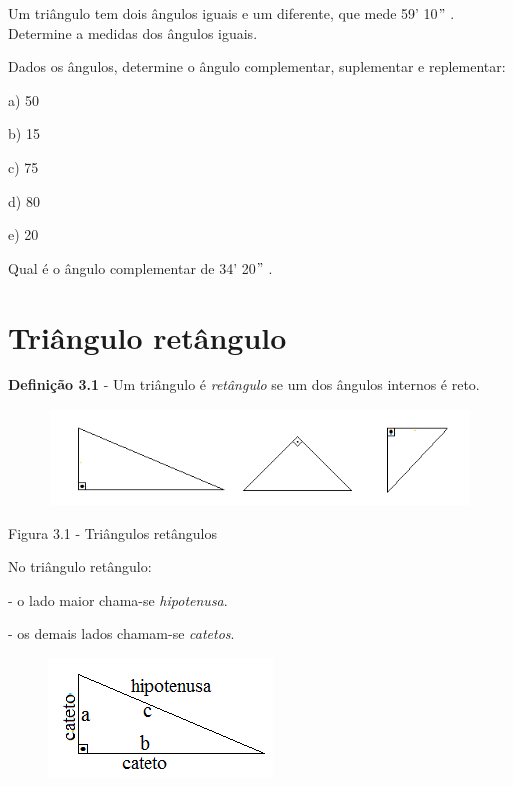 \begin{exercicios}
\exitem{} Um triângulo tem dois ângulos iguais e um diferente, que mede 59’ 10$"$ . Determine a medidas dos ângulos iguais.

\exitem{} Dados os ângulos, determine o ângulo complementar, suplementar e replementar:

a) 50\degree

b) 15\degree

c) 75\degree

d) 80\degree

e) 20\degree       

\exitem{} Qual é o ângulo complementar de  34’ 20$"$ .  
\end{exercicios}

\section{Triângulo retângulo}

\begin{caixa}
\textbf{Definição 3.1} - Um triângulo é \textit{retângulo} se um dos ângulos internos é reto.

\begin{figure}[H]
    \begin{Center}
        \includegraphics[width=5.59in,height=1.0in]{capitulos/trigonometria_e_funcoes_trigonometricas/media/image8.png}
    \end{Center}
\end{figure}

Figura 3.1 - Triângulos retângulos
\end{caixa}

\begin{caixa}
No triângulo retângulo:

\begin{multicols}{2}

- o lado maior chama-se \textit{hipotenusa}.     

- os demais lados chamam-se \textit{catetos}.
\end{multicols}

\begin{figure}[H]
    \begin{Center}
        \includegraphics[width=2.34in,height=1.25in]{capitulos/trigonometria_e_funcoes_trigonometricas/media/image9.png}
    \end{Center}
\end{figure}

\end{caixa}

